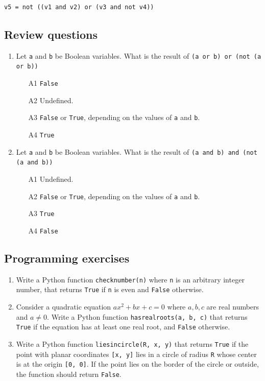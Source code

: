 \begin{verbatim}
v5 = not ((v1 and v2) or (v3 and not v4))
\end{verbatim}

\subsection{Review questions}

\begin{enumerate}
\item Let {\tt a} and {\tt b} be Boolean variables. What is the 
result of {\tt (a or b) or (not (a or b))}
\begin{enumerate}
\item[A1] {\tt False}
\item[A2] Undefined.
\item[A3] {\tt False} or {\tt True}, depending on the values of {\tt a} and {\tt b}.
\item[A4] {\tt True}
\end{enumerate}
\item Let {\tt a} and {\tt b} be Boolean variables. What is the 
result of {\tt (a and b) and (not (a and b))}
\begin{enumerate}
\item[A1] Undefined.
\item[A2] {\tt False} or {\tt True}, depending on the values of {\tt a} and {\tt b}.
\item[A3] {\tt True}
\item[A4] {\tt False}
\end{enumerate}
\end{enumerate}


\subsection{Programming exercises}

\begin{enumerate}
\item Write a Python function {\tt checknumber(n)} where {\tt n} is an arbitrary 
      integer number, that returns {\tt True} if {\tt n} is even and {\tt False}
      otherwise.
\item Consider a quadratic equation $ax^2 + bx + c = 0$ where $a, b, c$ are real numbers 
      and $a \not = 0$. Write a Python function 
      {\tt hasrealroots(a, b, c)} that returns {\tt True} if the equation has 
      at least one real root, and {\tt False} otherwise.
\item Write a Python function {\tt liesincircle(R, x, y)} that returns {\tt True} if 
      the point with planar coordinates {\tt [x, y]} lies in a circle of radius {\tt R}
      whose center is at the origin {\tt [0, 0]}. If the point lies on the border of the 
      circle or outside, the function should return {\tt False}.
\end{enumerate}

